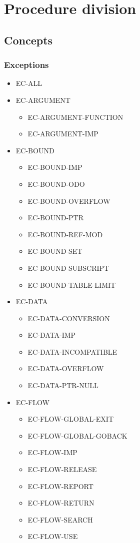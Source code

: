 \chapter{Procedure division}

\section{Concepts}

\subsection{Exceptions}

\begin{itemize}
\item EC-ALL

\item EC-ARGUMENT
  \begin{itemize}
  \item EC-ARGUMENT-FUNCTION
  \item EC-ARGUMENT-IMP
  \end{itemize}
\item EC-BOUND
  \begin{itemize}
  \item EC-BOUND-IMP
  \item EC-BOUND-ODO
  \item EC-BOUND-OVERFLOW
  \item EC-BOUND-PTR
  \item EC-BOUND-REF-MOD
  \item EC-BOUND-SET
  \item EC-BOUND-SUBSCRIPT
  \item EC-BOUND-TABLE-LIMIT
  \end{itemize}

\item EC-DATA
  \begin{itemize}
  \item EC-DATA-CONVERSION
  \item EC-DATA-IMP
  \item EC-DATA-INCOMPATIBLE
  \item EC-DATA-OVERFLOW
  \item EC-DATA-PTR-NULL
  \end{itemize}

\item EC-FLOW
  \begin{itemize}
  \item EC-FLOW-GLOBAL-EXIT
  \item EC-FLOW-GLOBAL-GOBACK
  \item EC-FLOW-IMP
  \item EC-FLOW-RELEASE
  \item EC-FLOW-REPORT
  \item EC-FLOW-RETURN
  \item EC-FLOW-SEARCH
  \item EC-FLOW-USE
  \end{itemize}


\end{itemize}
